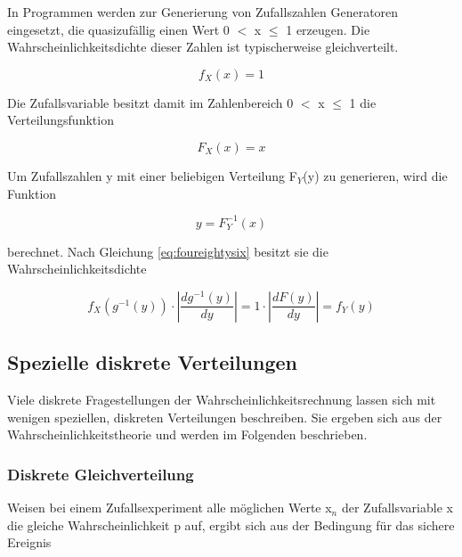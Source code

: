 \noindent In Programmen werden zur Generierung von Zufallszahlen Generatoren eingesetzt, die quasizuf\"{a}llig einen Wert 0 $\mathrm{<}$ x $\leq$ 1 erzeugen. Die Wahrscheinlichkeitsdichte dieser Zahlen ist typischerweise gleichverteilt.

\begin{equation}\label{eq:fourhundredten}
f_{X} (x)=1
\end{equation}

\noindent Die Zufallsvariable besitzt damit im Zahlenbereich 0 $\mathrm{<}$ x $\leq$ 1 die Verteilungsfunktion

\begin{equation}\label{eq:fourhundredeleven}
F_{X} (x)=x
\end{equation}

\noindent Um Zufallszahlen y mit einer beliebigen Verteilung F${}_{Y}$(y) zu generieren, wird die Funktion

\begin{equation}\label{eq:fourhundredtwelve}
y=F_{Y}^{-1} (x)
\end{equation}

\noindent berechnet. Nach Gleichung \eqref{eq:foureightysix} besitzt sie die Wahrscheinlichkeitsdichte

\begin{equation}\label{eq:fourhundredthirteen}
f_{X} \left(g^{-1} (y)\right)\cdot \left|\dfrac{dg^{-1} \left(y\right)}{dy} \right|=1\cdot \left|\dfrac{dF(y)}{dy} \right|=f_{Y} (y)
\end{equation}

\clearpage

\subsection{Spezielle diskrete Verteilungen}

\noindent Viele diskrete Fragestellungen der Wahrscheinlichkeitsrechnung lassen sich mit wenigen speziellen, diskreten Verteilungen beschreiben. Sie ergeben sich aus der Wahrscheinlichkeitstheorie und werden im Folgenden beschrieben.

\subsubsection{Diskrete Gleichverteilung}

\noindent Weisen bei einem Zufallsexperiment alle m\"{o}glichen Werte x$_{n}$ der Zufallsvariable x die gleiche Wahrscheinlichkeit p auf, ergibt sich aus der Bedingung f\"{u}r das sichere Ereignis

